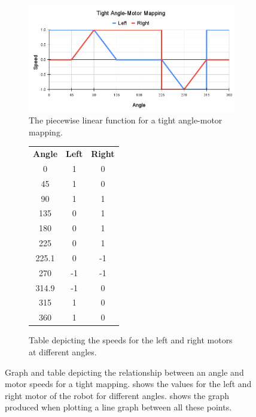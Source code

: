 \documentclass{l4proj}
\begin{document}
\begin{figure}[!h]
    \centering
    \begin{subfigure}[b]{0.75\textwidth}
        \includegraphics[width=\textwidth]{images/Tight Angle-Motor Mapping.png}
        \caption{The piecewise linear function for a tight angle-motor mapping.}
        \label{fig:tight-mapping-graph}
    \end{subfigure}
    \begin{subfigure}[b]{0.24\textwidth}
        \begin{tabular}{ccc}
            \textbf{Angle} & \textbf{Left} & \textbf{Right} \\
            0 & 1 & 0 \\
            45 & 1 & 0 \\
            90 & 1 & 1 \\
            135 & 0 & 1 \\
            180 & 0 & 1 \\
            225 & 0 & 1 \\
            225.1 & 0 & -1 \\
            270 & -1 & -1 \\
            314.9 & -1 & 0 \\
            315 & 1 & 0 \\
            360 & 1 & 0
        \end{tabular}
        \caption{Table depicting the speeds for the left and right motors at different angles.}
        \label{tab:tight-mapping-table}
    \end{subfigure}
    \caption{Graph and table depicting the relationship between an angle and motor speeds for a tight mapping.  shows the values for the left and right motor of the robot for different angles.  shows the graph produced when plotting a line graph between all these points.}
    \label{fig:tight-mapping}
\end{figure}
\end{document}
